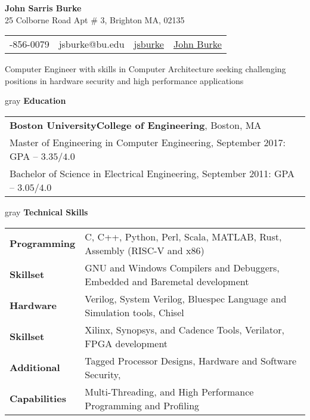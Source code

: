 \documentclass[10.5pt,letterpaper]{article}
\makeatletter
\newcommand{\org}[1]{\textbf{#1}}
\newcommand{\vertspace}{\vspace{1.2mm}}
\newcommand{\horzindent}{\hspace{3mm}}
\newcommand{\tablewidth}{.9\linewidth}
\newcommand{\name}{John Sarris Burke}
\newcommand{\infoshift}{\hspace{15.5mm}}
\newcommand{\address}{25 Colborne Road Apt \# 3, Brighton MA, 02135 }
\newcommand{\phone}{781-856-0079}
\newcommand{\email}{jsburke@bu.edu}
\newcommand{\github}{\href{https://github.com/jsburke/}{jsburke}}
\newcommand{\linkedin}{\href{https://www.linkedin.com/in/john-burke-51325935/}{John Burke}}
\newcommand{\undergradmajor}{Electrical Engineering}
\newcommand{\undergradend}{September 2011}
\newcommand{\grad}{Boston University}
\newcommand{\gradschool}{College of Engineering}
\newcommand{\gradmajor}{Computer Engineering}
\newcommand{\gradend}{September 2017}
\newcommand{\objective}{Computer Engineer with skills in Computer Architecture seeking challenging positions in hardware security and high performance applications}
\newlength\myheight
\newlength\mydepth
\newcommand*\inlineicon[1]{%
  \settototalheight\myheight{Xygp}%
  \settodepth\mydepth{Xygp}%
  \raisebox{-\mydepth}{\texttt{[image: \#1]}}%
}
\newcommand{\iconemail}{\inlineicon{images/email-icon-2048}\space}
\newcommand{\icongithub}{\inlineicon{images/GitHub-Mark-120px-plus}\space}
\newcommand{\iconphone}{\inlineicon{images/phone-icon-black}\space}
\newcommand{\iconlinkedin}{\inlineicon{images/linkedin-icon-black}\space}
\makeatother
\begin{document}
	
	\begin{center}	
		\textbf{\large \name}\\
		\address\\
		\begin{tabular}{c||c||c||c}
			\infoshift \iconphone \phone & \iconemail \email & \icongithub \github & \iconlinkedin \linkedin \\
		\end{tabular}
		\newline \objective
	\end{center}

	\noindent
	\begin{heading}{gray}
		\textbf{Education}
	\end{heading}
		\begin{tabular*}{\tablewidth}{l}
			\org{\grad\space\gradschool}, Boston, MA \\
			\horzindent Master of Engineering in \gradmajor , \gradend\space : GPA -- $3.35 / 4.0$ \\
			\horzindent Bachelor of Science in \undergradmajor , \undergradend : GPA -- $3.05 / 4.0$ \\
		\end{tabular*}

	\noindent
	\begin{heading}{gray}
		\textbf{Technical Skills}
	\end{heading}
	\begin{tabular*}{\tablewidth}{ll}
          \textbf{Programming}  & C, C++, Python, Perl, Scala, MATLAB, Rust, Assembly (RISC-V and x86) \\
          \textbf{Skillset}     & GNU and Windows Compilers and Debuggers, Embedded and Baremetal development \\ \hline
          \textbf{Hardware}     & Verilog, System Verilog, Bluespec Language and Simulation tools, Chisel \\
          \textbf{Skillset}     & Xilinx, Synopsys, and Cadence Tools, Verilator, FPGA development \\ \hline
          \textbf{Additional}   & Tagged Processor Designs, Hardware and Software Security,\\
          \textbf{Capabilities} & Multi-Threading, and High Performance Programming and Profiling \\ 
	\end{tabular*}

	\iffalse
	
\end{document}

